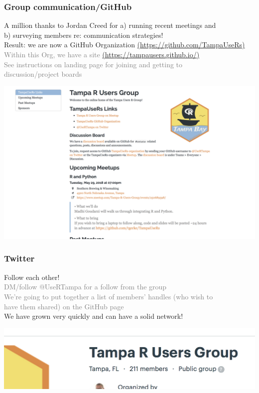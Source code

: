 \documentclass{beamer}
\newcommand{\si}[1]{\hspace{.5cm} \textcolor{gray} {#1}\\}
\newcommand{\sicont}[1]{\hspace{1cm} \textcolor{gray} {#1}\\}
\begin{document}
{\begin{frame}[t]
\frametitle{Group communication/GitHub}
A million thanks to Jordan Creed for a) running recent meetings and \\
\hspace{.5cm} b) surveying members re: communication strategies!\\
\vspace{.2cm}
Result: we are now a GitHub Organization {\tiny\href{https://github.com/TampaUseRs}{(https://github.com/TampaUseRs)}}\\
\si{Within this Org, we have a site {\tiny\href{https://tampausers.github.io/}{(https://tampausers.github.io/)}}}
\si{See instructions on landing page for joining and getting to}
\sicont{discussion/project boards}
\begin{center}
\includegraphics[scale=.25, trim=0 0 0 0]{figures/webshot.png}
\end{center}
\end{frame}

\begin{frame}[t]
\frametitle{Twitter}
Follow each other! \\
\si{DM/follow @UseRTampa for a follow from the group}
\si{We're going to put together a list of members' handles (who wish to}
\sicont{have them shared) on the GitHub page}
\vspace{.2cm}
We have grown very quickly and can have a solid network!\\
\begin{center}
\includegraphics[scale=.25, trim=0 0 0 0]{figures/members.png}
\end{center}
\end{frame}
}
\end{document}
